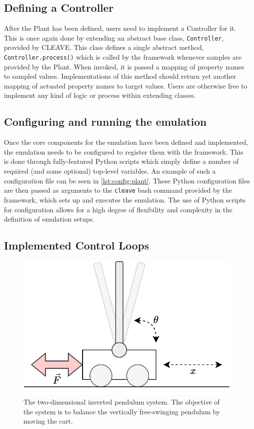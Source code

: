\subsection{Defining a Controller}

After the Plant has been defined, users need to implement a Controller for it.
This is once again done by extending an abstract base class, \texttt{Controller}, provided by CLEAVE.\@
This class defines a single abstract method, \texttt{Controller.process()} which is called by the framework whenever samples are provided by the Plant.
When invoked, it is passed a mapping of property names to sampled values.
Implementations of this method should return yet another mapping of actuated property names to target values.
Users are otherwise free to implement any kind of logic or process within extending classes.

\subsection{Configuring and running the emulation}

Once the core components for the emulation have been defined and implemented, the emulation needs to be configured to register them with the framework.
This is done through fully-featured Python scripts which simply define a number of required (and some optional) top-level variables.
An example of such a configuration file can be seen in \cref{lst:config:plant}.
These Python configuration files are then passed as arguments to the \texttt{cleave} bash command provided by the framework, which sets up and executes the emulation.
The use of Python scripts for configuration allows for a high degree of flexibility and complexity in the definition of emulation setups.

\subsection{Implemented Control Loops}

\begin{figure}
    \centering
    \includegraphics[width=.7\columnwidth]{images/inverted_pendulum.png}
    \caption{
        The two-dimensional inverted pendulum system.
        The objective of the system is to balance the vertically free-swinging pendulum by moving the cart.
    }\label{fig:invpend}
\end{figure}

